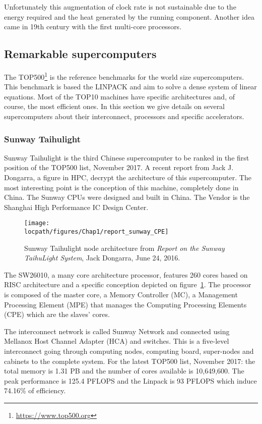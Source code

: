 Unfortunately this augmentation of clock rate is not sustainable due to the energy required and the heat generated by the running component. 
Another idea came in 19th century with the first multi-core processors. 


\subsection{Remarkable supercomputers}
The TOP500\footnote{\url{https://www.top500.org}} is the reference benchmarks for the world size supercomputers. 
This benchmark is based the LINPACK and aim to solve a dense system of linear equations.
Most of the TOP10 machines have specific architectures and, of course, the most efficient ones. 
In this section we give details on several supercomputers about their interconnect, processors and specific accelerators. 

\subsubsection{Sunway Taihulight}
Sunway Taihulight is the third Chinese supercomputer to be ranked in the first position of the TOP500 list, November 2017. 
A recent report from Jack J. Dongarra, a figure in HPC, decrypt the architecture of this supercomputer\cite{dongarra2016report}. 
The most interesting point is the conception of this machine, completely done in China. 
The Sunway CPUs were designed and built in China. The Vendor is the Shanghai High Performance IC Design Center. 

\begin{figure}[t!]
\centering
\texttt{[image: \\locpath/figures/Chap1/report\_sunway\_CPE]}
\caption{Sunway Taihulight node architecture from \textit{Report on the Sunway TaihuLight System}, Jack Dongarra, June 24, 2016.}
\label{fig:chap1_report_sunway_CPE}
\end{figure}

The SW26010, a many core architecture processor, features 260 cores based on RISC architecture and a specific conception depicted on figure~\ref{fig:chap1_report_sunway_CPE}. 
The processor is composed of the master core, a Memory Controller (MC), a Management Processing Element (MPE) that manages the Computing Processing Elements (CPE) which are the slaves’ cores. 

The interconnect network is called Sunway Network and connected using Mellanox Host Channel Adapter (HCA) and switches. 
This is a five-level interconnect going through computing nodes, computing board, super-nodes and cabinets to the complete system.
For the latest TOP500 list, November 2017: the total memory is 1.31 PB and the number of cores available is 10,649,600.
The peak performance is 125.4 PFLOPS and the Linpack is 93 PFLOPS which induce 74.16\% of efficiency. 

